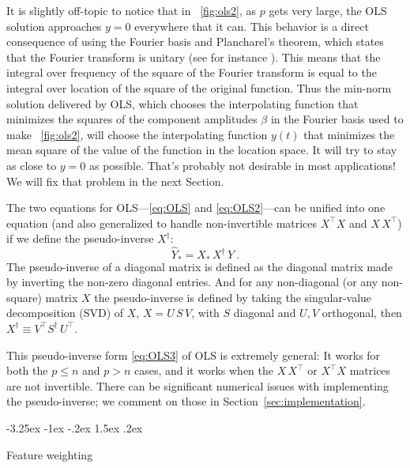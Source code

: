 \documentclass[12pt,letterpaper]{article}
\makeatletter
\renewcommand\section{\@startsection {section}{1}{\z@}%
  {-3.25ex \@plus -1ex \@minus -.2ex}%
  {1.5ex \@plus .2ex}%
  {\raggedright\normalfont\large\bfseries}}
\newcommand{\sectionname}{Section}
\makeatother
\begin{document}
It is slightly off-topic to notice that in \figurename~\ref{fig:ols2}, as $p$ gets very large, the OLS solution approaches $y=0$ everywhere that it can.
This behavior is a direct consequence of using the Fourier basis and Plancharel's theorem, which states that the Fourier transform is unitary (see for instance \citealt{folland2016course}).
This means that the integral over frequency of the square of the Fourier transform is equal to the integral over location of the square of the original function.
Thus the min-norm solution delivered by OLS, which chooses the interpolating function that minimizes the squares of the component amplitudes $\beta$ in the Fourier basis used to make \figurename~\ref{fig:ols2}, will choose the interpolating function $y(t)$ that minimizes the mean square of the value of the function in the location space.
It will try to stay as close to $y=0$ as possible.
That's probably not desirable in most applications! We will fix that problem in the next \sectionname.

The two equations for OLS---\eqref{eq:OLS} and \eqref{eq:OLS2}---can be unified into one equation (and also generalized to handle non-invertible matrices $X^\top X$ and $X\,X^\top$) if we define the pseudo-inverse $X^\dagger$:
\begin{equation}\label{eq:OLS3}
    \hat{Y}_\ast = X_\ast\,X^\dagger\,Y
    ~.
\end{equation}
The pseudo-inverse of a diagonal matrix is defined as the diagonal matrix made by inverting the non-zero diagonal entries. And for any non-diagonal (or any non-square) matrix $X$ the pseudo-inverse is defined by taking the singular-value decomposition (SVD) of $X$, $X=U\,S\,V$, with $S$ diagonal and $U,V$ orthogonal, then $X^\dagger \equiv V^\top S^\dagger\,U^\top$.

This pseudo-inverse form \eqref{eq:OLS3} of OLS is extremely general: It works for both the $p\le n$ and $p>n$ cases, and it works when the $X\,X^\top$ or $X^\top X$ matrices are not invertible.
There can be significant numerical issues with implementing the pseudo-inverse; we comment on those in \sectionname~\ref{sec:implementation}.

\section{Feature weighting}\label{sec:fwols}
\end{document}
